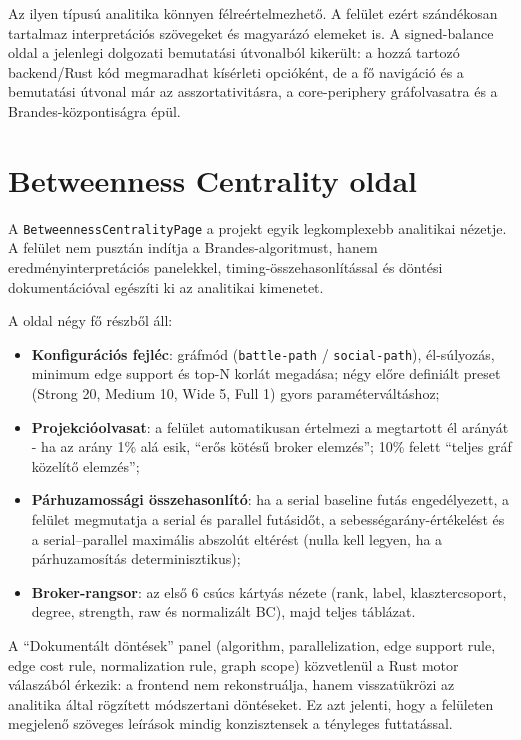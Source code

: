 Az ilyen típusú analitika könnyen félreértelmezhető. A felület ezért szándékosan tartalmaz interpretációs szövegeket és magyarázó elemeket is. A signed-balance oldal a jelenlegi dolgozati bemutatási útvonalból kikerült: a hozzá tartozó backend/Rust kód megmaradhat kísérleti opcióként, de a fő navigáció és a bemutatási útvonal már az asszortativitásra, a core-periphery gráfolvasatra és a Brandes-központiságra épül.

\section{Betweenness Centrality oldal}

A \texttt{BetweennessCentralityPage} a projekt egyik legkomplexebb analitikai nézetje. A felület nem pusztán indítja a Brandes-algoritmust, hanem eredményinterpretációs panelekkel, timing-összehasonlítással és döntési dokumentációval egészíti ki az analitikai kimenetet.

A oldal négy fő részből áll:

\begin{itemize}
    \item \textbf{Konfigurációs fejléc}: gráfmód (\texttt{battle-path} / \texttt{social-path}), él-súlyozás, minimum edge support és top-N korlát megadása; négy előre definiált preset (Strong 20, Medium 10, Wide 5, Full 1) gyors paraméterváltáshoz;
    \item \textbf{Projekcióolvasat}: a felület automatikusan értelmezi a megtartott él arányát - ha az arány 1\% alá esik, ``erős kötésű broker elemzés''; 10\% felett ``teljes gráf közelítő elemzés'';
    \item \textbf{Párhuzamossági összehasonlító}: ha a serial baseline futás engedélyezett, a felület megmutatja a serial és parallel futásidőt, a sebességarány-értékelést és a serial--parallel maximális abszolút eltérést (nulla kell legyen, ha a párhuzamosítás determinisztikus);
    \item \textbf{Broker-rangsor}: az első 6 csúcs kártyás nézete (rank, label, klasztercsoport, degree, strength, raw és normalizált BC), majd teljes táblázat.
\end{itemize}

A ``Dokumentált döntések'' panel (algorithm, parallelization, edge support rule, edge cost rule, normalization rule, graph scope) közvetlenül a Rust motor válaszából érkezik: a frontend nem rekonstruálja, hanem visszatükrözi az analitika által rögzített módszertani döntéseket. Ez azt jelenti, hogy a felületen megjelenő szöveges leírások mindig konzisztensek a tényleges futtatással.

